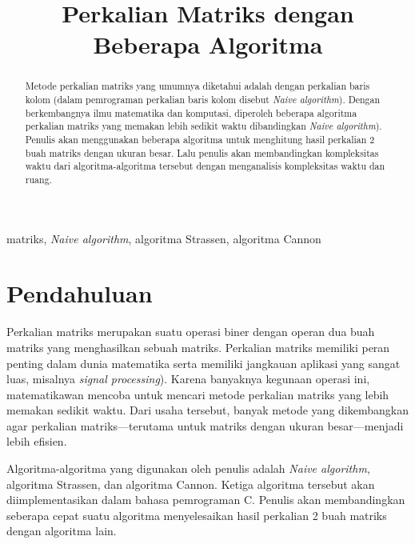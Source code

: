 \documentclass[conference]{IEEEtran}
\begin{document}
\title{Perkalian Matriks dengan Beberapa Algoritma}

\author{
}

\maketitle

\begin{abstract}
Metode perkalian matriks yang umumnya diketahui adalah dengan perkalian baris kolom (dalam pemrograman perkalian baris kolom disebut \textit{Naive algorithm}).
Dengan berkembangnya ilmu matematika dan komputasi, diperoleh beberapa algoritma perkalian matriks yang memakan lebih sedikit waktu dibandingkan \textit{Naive algorithm}).
Penulis akan menggunakan beberapa algoritma untuk menghitung hasil perkalian 2 buah matriks dengan ukuran besar.
Lalu penulis akan membandingkan kompleksitas waktu dari algoritma-algoritma tersebut dengan menganalisis kompleksitas waktu dan ruang.
\end{abstract}

\begin{IEEEkeywords}
matriks, \textit{Naive algorithm}, algoritma Strassen, algoritma Cannon
\end{IEEEkeywords}

\section{Pendahuluan}
Perkalian matriks merupakan suatu operasi biner dengan operan dua buah matriks yang menghasilkan sebuah matriks.
Perkalian matriks memiliki peran penting dalam dunia matematika serta memiliki jangkauan aplikasi yang sangat luas, misalnya \textit{signal processing}).
Karena banyaknya kegunaan operasi ini, matematikawan mencoba untuk mencari metode perkalian matriks yang lebih memakan sedikit waktu.
Dari usaha tersebut, banyak metode yang dikembangkan agar perkalian matriks---terutama untuk matriks dengan ukuran besar---menjadi lebih efisien.

Algoritma-algoritma yang digunakan oleh penulis adalah \textit{Naive algorithm}, algoritma Strassen, dan algoritma Cannon.
Ketiga algoritma tersebut akan diimplementasikan dalam bahasa pemrograman C.
Penulis akan membandingkan seberapa cepat suatu algoritma menyelesaikan hasil perkalian 2 buah matriks dengan algoritma lain.
\end{document}
